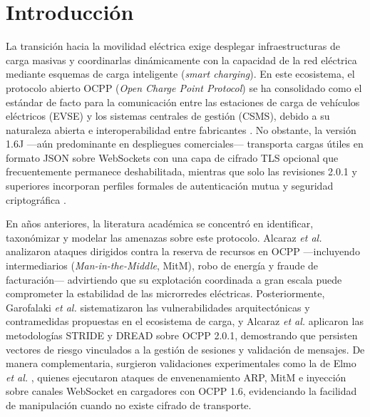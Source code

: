 \documentclass[conference]{IEEEtran}
\begin{document}
\section{Introducción}

La transición hacia la movilidad eléctrica exige desplegar infraestructuras de carga masivas y coordinarlas dinámicamente con la capacidad de la red eléctrica mediante esquemas de carga inteligente (\textit{smart charging}). En este ecosistema, el protocolo abierto OCPP (\textit{Open Charge Point Protocol}) se ha consolidado como el estándar de facto para la comunicación entre las estaciones de carga de vehículos eléctricos (EVSE) y los sistemas centrales de gestión (CSMS), debido a su naturaleza abierta e interoperabilidad entre fabricantes \cite{garofalaki2022}. No obstante, la versión 1.6J ---aún predominante en despliegues comerciales--- transporta cargas útiles en formato JSON sobre WebSockets con una capa de cifrado TLS opcional que frecuentemente permanece deshabilitada, mientras que solo las revisiones 2.0.1 y superiores incorporan perfiles formales de autenticación mutua y seguridad criptográfica \cite{garofalaki2022,alcaraz2023}.

En años anteriores, la literatura académica se concentró en identificar, taxonómizar y modelar las amenazas sobre este protocolo. Alcaraz \textit{et al.} \cite{alcaraz2017} analizaron ataques dirigidos contra la reserva de recursos en OCPP ---incluyendo intermediarios (\textit{Man-in-the-Middle}, MitM), robo de energía y fraude de facturación--- advirtiendo que su explotación coordinada a gran escala puede comprometer la estabilidad de las microrredes eléctricas. Posteriormente, Garofalaki \textit{et al.} \cite{garofalaki2022} sistematizaron las vulnerabilidades arquitectónicas y contramedidas propuestas en el ecosistema de carga, y Alcaraz \textit{et al.} \cite{alcaraz2023} aplicaron las metodologías STRIDE y DREAD sobre OCPP 2.0.1, demostrando que persisten vectores de riesgo vinculados a la gestión de sesiones y validación de mensajes. De manera complementaria, surgieron validaciones experimentales como la de Elmo \textit{et al.} \cite{elmo2023}, quienes ejecutaron ataques de envenenamiento ARP, MitM e inyección sobre canales WebSocket en cargadores con OCPP 1.6, evidenciando la facilidad de manipulación cuando no existe cifrado de transporte.
\end{document}
